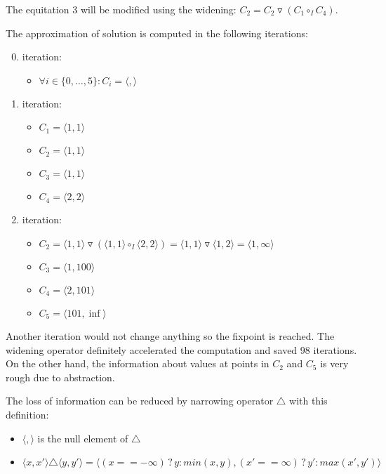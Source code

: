 \documentclass[a4paper, 12pt]{article}
\newcommand{\interval}[2]{\langle #1,#2 \rangle}
\newcommand{\ajoin}[0]{\circ}
\newcommand{\wid}[0]{\triangledown}
\newcommand{\nar}[0]{\triangle}
\newcommand{\iintg}[0]{I}
\newcommand{\ijoin}[0]{\ajoin_\iintg}
\begin{document}
The equitation $3$ will be modified using the widening:
$C_2 = C_2 \wid (C_1 \ijoin C_4)$.

The approximation of solution is computed in the following iterations:
\begin{enumerate}
	\setcounter{enumi}{-1}
	\item \hspace{-0.5em} iteration:
		\begin{itemize}
			\item $\forall i \in \{0,\ldots,5\}: C_i = \interval{}{}$
		\end{itemize}
	
	\item \hspace{-0.5em} iteration:
		\begin{itemize}
			\item $C_1 = \interval{1}{1}$
			\item $C_2 = \interval{1}{1}$
			\item $C_3 = \interval{1}{1}$
			\item $C_4 = \interval{2}{2}$
		\end{itemize}
	
	\item \hspace{-0.5em} iteration:
		\begin{itemize}
			\item $C_2 = \interval{1}{1} \wid (\interval{1}{1} \ijoin \interval{2}{2})
		               = \interval{1}{1} \wid \interval{1}{2} = \interval{1}{\infty}$
			\item $C_3 = \interval{1}{100}$
			\item $C_4 = \interval{2}{101}$
			\item $C_5 = \interval{101}{\inf}$
		\end{itemize}
\end{enumerate}

Another iteration would not change anything so the fixpoint is reached.
The widening operator definitely accelerated the computation and
saved $98$ iterations.
On the other hand, the information about values at points in $C_2$ and $C_5$
is very rough due to abstraction.

The loss of information can be reduced by narrowing operator $\nar$ with
this definition:
\begin{itemize}
	\item $\interval{}{}$ is the null element of $\nar$
	\item $\interval{x}{x'} \nar \interval{y}{y'} =
		\interval{(x == -\infty)\,?\,y : min(x,y)}{(x' == \infty)\,?\,y' : max(x',y')}$
\end{itemize}
\end{document}
